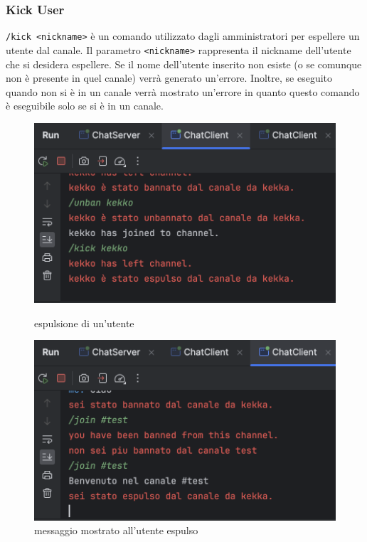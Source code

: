 \subsubsection{Kick User}
\item \texttt{/kick <nickname>} è un comando utilizzato dagli amministratori per espellere un utente dal canale. Il parametro \texttt{<nickname>} rappresenta il nickname dell'utente che si desidera espellere. Se il nome dell'utente inserito non esiste (o se comunque non è presente in quel canale) verrà generato un'errore. Inoltre, se eseguito quando non si è in un canale verrà mostrato un'errore in quanto questo comando è eseguibile solo se si è in un canale.
\begin{figure}[h]
  \centering
  \begin{minipage}{0.45\textwidth}
    \includegraphics[width=\linewidth]{imagens/outputs/9.png}
    \caption{espulsione di un'utente}
  \end{minipage}\hfill
  \begin{minipage}{0.45\textwidth}
    \includegraphics[width=\linewidth]{imagens/outputs/9_2.png}
    \caption{messaggio mostrato all'utente espulso}
  \end{minipage}\hfill
\end{figure}

